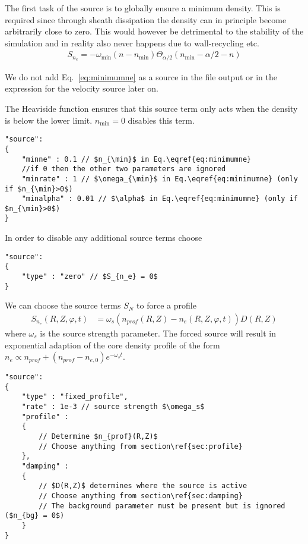 The first task of the source is to globally ensure a minimum density. This
is required since through sheath dissipation the density can in
principle become arbitrarily close to zero. This would however
be detrimental to the stability of the simulation and in reality
also never happens due to wall-recycling etc.
\begin{align}
    S_{n_e} = -\omega_{\min} ( n - n_{\min}) \Theta_{\alpha/2}( n_{\min}-\alpha/2 -n)
    \label{eq:minimumne}
\end{align}
\begin{tcolorbox}[title=Note]
    We do not add Eq.~\eqref{eq:minimumne} as a source in the file output or in
    the expression for the velocity source later on.
\end{tcolorbox}
The Heaviside function ensures that this source term only acts when the density
is below the lower limit. $n_{\min}=0$ disables this term.
\begin{verbatim}
"source":
{
    "minne" : 0.1 // $n_{\min}$ in Eq.\eqref{eq:minimumne}
    //if 0 then the other two parameters are ignored
    "minrate" : 1 // $\omega_{\min}$ in Eq.\eqref{eq:minimumne} (only if $n_{\min}>0$)
    "minalpha" : 0.01 // $\alpha$ in Eq.\eqref{eq:minimumne} (only if $n_{\min}>0$)
}
\end{verbatim}
\noindent
In order to disable any additional source terms choose
\begin{verbatim}
"source":
{
    "type" : "zero" // $S_{n_e} = 0$
}
\end{verbatim}
\noindent We can choose the source terms $S_N$ to force a profile
\begin{align} \label{eq:electron_source}
    S_{n_e}(R,Z,\varphi, t) &= \omega_s (n_{prof}(R,Z) - n_e(R,Z,\varphi, t))D(R,Z)
\end{align}
where $\omega_s$ is the source strength parameter.
The forced source will result in exponential adaption of the core
density profile of the form $n_e \propto n_{prof}+(n_{prof}-n_{e,0})e^{-\omega_st}$.
\begin{verbatim}
"source":
{
    "type" : "fixed_profile",
    "rate" : 1e-3 // source strength $\omega_s$
    "profile" :
    {
        // Determine $n_{prof}(R,Z)$
        // Choose anything from section\ref{sec:profile}
    },
    "damping" :
    {
        // $D(R,Z)$ determines where the source is active
        // Choose anything from section\ref{sec:damping}
        // The background parameter must be present but is ignored ($n_{bg} = 0$)
    }
}
\end{verbatim}

